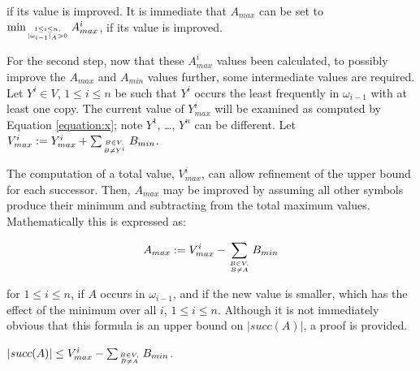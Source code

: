 \documentclass{llncs}
\begin{document}
	\noindent if its value is improved. It is immediate that $A_{max}$ can be set to $\min_{1\leq i \leq n, \atop |\omega_{i-1}|_{A}> 0} A^{i}_{max}$, if its value is improved.
	
	For the second step, now that these $A^{i}_{max}$ values been calculated, to possibly improve the $A_{max}$ and $A_{min}$ values further, some intermediate values are required. Let $Y^{i} \in V$, $1 \leq i \leq n$ be such that $Y^{i}$ occurs the least frequently in $\omega_{i-1}$ with at least one copy. The current value of $Y^{i}_{max}$ will be examined as computed by Equation \ref{equation:x}; note $Y^{1}$, \ldots, $Y^{n}$ can be different. Let $V^{i}_{max} := Y^{i}_{max} + \sum_{B \in V, \atop B \neq Y^{i}} B_{min}$. 
	
	The computation of a total value, $V^{i}_{max}$, can allow refinement of the upper bound for each successor. Then, $A_{max}$ may be improved by assuming all other symbols produce their minimum and subtracting from the total maximum values.  Mathematically this is expressed as:
	
	\begin{equation}
	A_{max} := V^{i}_{max} - \sum_{B \in V, \atop B \neq A} B_{min}
	\end{equation}
	
	\noindent for $1 \leq i \leq n$, if $A$ occurs in $\omega_{i-1}$, and if the new value is smaller, which has the effect of the minimum over all $i$, $1 \leq i \leq n$. Although it is not immediately obvious that this formula is an upper bound on $|succ(A)|$, a proof is provided. 
	
	
	
	
	\begin{claim}
		$|succ(A)| \leq V^{i}_{max} - \sum_{B \in V, \atop B \neq A} B_{min}$.
	\end{claim}
	
\end{document}

